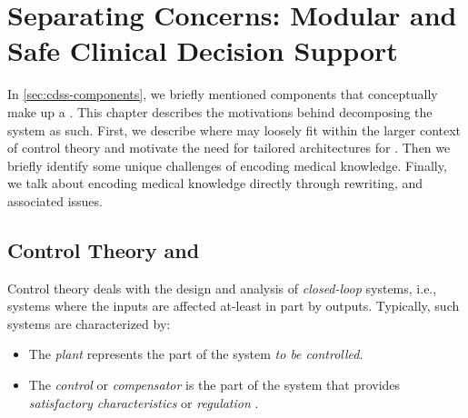 \chapter{Separating Concerns: Modular and Safe Clinical Decision Support}\label{chapter:separating-concerns}

In \autoref{sec:cdss-components}, we briefly mentioned components that
conceptually make up a \CDSS{}. This chapter describes the motivations
behind decomposing the system as such. First, we describe where
\CDSSs{} may loosely fit within the larger context of control
theory and motivate the need for tailored architectures for \CDSSs{}.
Then we briefly identify some unique challenges of encoding medical knowledge.
Finally, we talk about encoding medical knowledge directly through
rewriting, and associated issues.

\section{Control Theory and \CDSSs{}}\label{sec:control-theory-cdss-comparison}
Control theory deals with the design and analysis of \emph{closed-loop}
systems, i.e., systems where the inputs are affected at-least in part
by outputs. Typically, such systems are characterized by:
\begin{itemize}
  \item The \emph{plant} represents the part of the system \emph{to be
  controlled}.
  \item The \emph{control} or \emph{compensator} is the part of the system
  that provides \emph{satisfactory characteristics} or \emph{regulation}
  \cite{SimrockTR08}.
\end{itemize}

